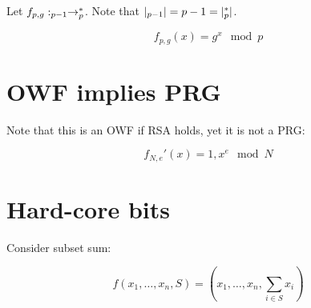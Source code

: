 \documentclass{idc_msc}
\let\ints\relax
\newcommand{\ints}{\ensuremath{\mathbb{Z}}}
\begin{document}



Let \(f_{p,g} : \ints_{p-1} \to \ints_{p}^*\). Note that \(|\ints_{p-1}| = p-1 = |\ints_{p}^*|\).

\[
  f_{p,g}(x) = g^x \mod p
\]

\section{OWF implies PRG}

Note that this is an OWF if RSA holds, yet it is not a PRG:

\[
  f_{N, e}' (x) = 1, x^{e} \mod N
\]

\section{Hard-core bits}

Consider subset sum:

\[f(x_1, \ldots, x_n, S) = (x_1, \ldots, x_n, \sum_{i\in S} x_i)\]





\end{document}
